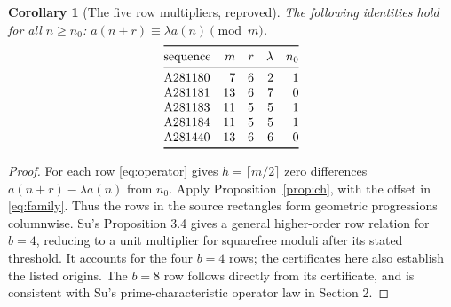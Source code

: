 \documentclass[11pt]{article}
\newtheorem{corollary}[theorem]{Corollary}
\begin{document}
\begin{corollary}[The five row multipliers, reproved]\label{cor:rows}
The following identities hold for all $n\geq n_0$:
$a(n+r)\equiv\lambda a(n)\pmod m$.
\[
\begin{array}{@{}lrrrr@{}}\toprule
 \text{sequence}&m&r&\lambda&n_0\\\midrule
 \mathrm{A281180}&7&6&2&1\\
 \mathrm{A281181}&13&6&7&0\\
 \mathrm{A281183}&11&5&5&1\\
 \mathrm{A281184}&11&5&5&1\\
 \mathrm{A281440}&13&6&6&0\\\bottomrule
\end{array}
\]
\end{corollary}
\begin{proof}
For each row \eqref{eq:operator} gives $h=\lceil m/2\rceil$ zero
differences $a(n+r)-\lambda a(n)$ from $n_0$. Apply
Proposition~\ref{prop:ch}, with the offset in \eqref{eq:family}.
Thus the rows in the source rectangles form geometric progressions
columnwise. Su's Proposition 3.4 gives a general higher-order row
relation for $b=4$, reducing to a unit multiplier for squarefree moduli
after its stated threshold. It accounts for the four $b=4$ rows;
the certificates here also establish the listed origins.
The $b=8$ row follows directly from its certificate, and is consistent
with Su's prime-characteristic operator law in Section 2.
\end{proof}
\end{document}
